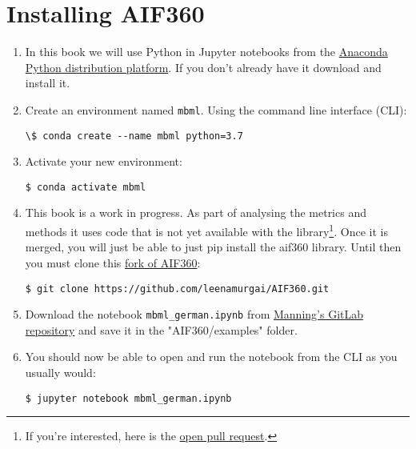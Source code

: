 \chapter{Installing AIF360}\label{app_Install}

\begin{enumerate}[leftmargin=*]
\item In this book we will use Python in Jupyter notebooks from the \href{https://www.anaconda.com//products/individual}{Anaconda Python distribution platform}. If you don't already have it download and install it.
%
\newline
%
\item Create an environment named \texttt{mbml}. Using the command line interface (CLI):
\begin{lstlisting}
\$ conda create --name mbml python=3.7
\end{lstlisting}
%
\item Activate your new environment:
\begin{lstlisting}
$ conda activate mbml
\end{lstlisting}
%
%
\item This book is a work in progress. As part of analysing the metrics and methods it uses code that is not yet available with the library\footnote{If you're interested, here is the \href{https://github.com/Trusted-AI/AIF360/pull/214}{open pull request}.}. Once it is merged, you will just be able to just pip install the aif360 library. Until then you must clone this \href{https://github.com/leenamurgai/AIF360}{fork of AIF360}:
%
\begin{lstlisting}
$ git clone https://github.com/leenamurgai/AIF360.git
\end{lstlisting}
%
\item Download the notebook \texttt{mbml\_german.ipynb} from \href{https://git.manning.com/agileauthor/murgai/-/blob/master/code/mbml\_german.ipynb}{Manning's GitLab repository} and save it in the "AIF360/examples" folder.
%
\newline
%
\item You should now be able to open and run the notebook from the CLI as you usually would:
\begin{lstlisting}
$ jupyter notebook mbml_german.ipynb
\end{lstlisting}
\end{enumerate}






